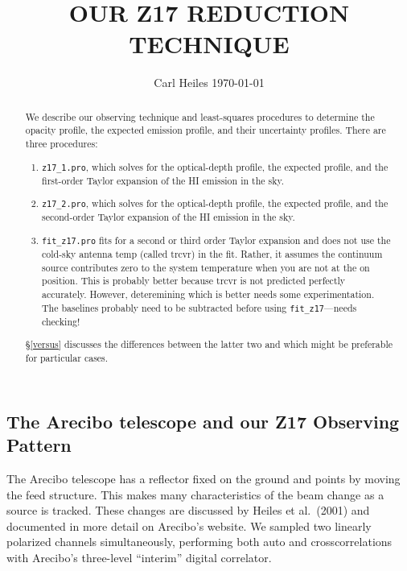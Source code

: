\documentclass[12pt,preprint]{aastex}
\begin{document}
\title{OUR Z17 REDUCTION TECHNIQUE}

\author{Carl Heiles \today}

\begin{abstract}
We describe our observing technique and least-squares procedures to
determine the opacity profile, the expected emission profile, and their
uncertainty profiles. There are three procedures: \begin{enumerate}
\item {\tt z17\_1.pro}, which solves for the optical-depth profile, the
  expected profile, and the first-order Taylor expansion of the HI
  emission in the sky.
\item {\tt z17\_2.pro}, which solves for the optical-depth profile, the
  expected profile, and the second-order Taylor expansion of the HI
  emission in the sky.

\item {\tt fit\_z17.pro} fits for a second or third order Taylor expansion
  and does not use the cold-sky antenna temp (called trcvr) in the
  fit. Rather, it assumes the continuum source contributes zero to the
  system temperature when you are not at the on position. This is
  probably better because trcvr is not predicted perfectly
  accurately. However, deteremining which is better needs some
  experimentation. The baselines probably need to be subtracted before
  using {\tt fit\_z17}---needs checking!

\end{enumerate}
\S \ref{versus} discusses the differences between the latter two and which
might be preferable for particular cases.
\end{abstract}

\subsection{The Arecibo telescope and our Z17 Observing Pattern}

	The Arecibo telescope has a reflector fixed on the ground and
points by moving the feed structure.  This makes many characteristics of
the beam change as a source is tracked.  These changes are discussed by
Heiles et al.\ (2001) and documented in more detail on Arecibo's website.
We sampled two linearly polarized channels simultaneously, performing
both auto and crosscorrelations with Arecibo's three-level ``interim''
digital correlator. 
\end{document}
